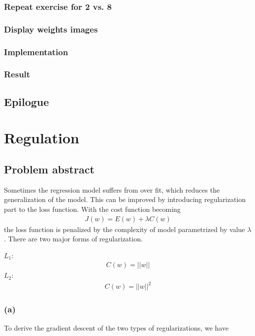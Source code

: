 \documentclass{article}
\begin{document}
\subsubsection{}
\subsubsection{}
\subsubsection{Repeat exercise for 2 vs. 8}
\subsubsection{Display weights images}

\subsubsection{Implementation}
\subsubsection{Result}
\subsection{Epilogue}

\section{Regulation}
\subsection{Problem abstract}
Sometimes the regression model suffers from over fit, which reduces the generalization of the model. This can be improved by introducing regularization part to the loss function. With the cost function becoming \begin{align*}
J(w) = E(w) + \lambda C(w)
\end{align*}
 the loss function is penalized by the complexity of model parametrized by value $\lambda$. There are two major forms of regularization. 
 
 $L_1:$\begin{align*}
  C(w) = ||w||
  \end{align*}
 $L_2:$\begin{align*}
 C(w) = ||w||^2
 \end{align*}

\subsubsection*{(a)} 
To derive the gradient descent of the two types of regularizations, we have 
\end{document}
